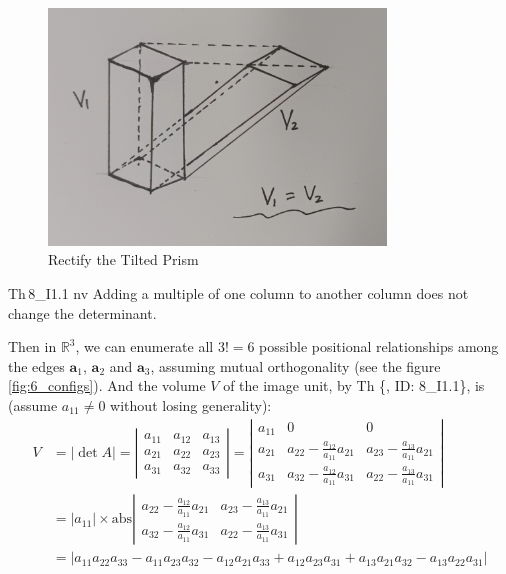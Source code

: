 \documentclass{article}
\begin{document}
\begin{figure}[H]
    \centering
    \includegraphics[width=0.8\textwidth]{figs_I1/2.jpg}
    \caption{Rectify the Tilted Prism}
    \label{fig:rectify_prism}
\end{figure}

\begin{Th}{Th\,8\_I1.1 nv}
    Adding a multiple of one column to another column does not change the determinant.
\end{Th}

Then in $\mathbb{R}^3$, we can enumerate all $3!=6$ possible positional relationships among the edges $\pmb{a}_1$, $\pmb{a}_2$ and $\pmb{a}_3$, assuming mutual orthogonality (see the figure \ref{fig:6_configs}). And the volume $V$ of the image unit, by Th \{, ID: 8\_I1.1\}, is (assume $a_{11}\neq 0$ without losing generality):
\begin{equation}
    \begin{aligned}
        V &= |\det A| = \left|\begin{array}{ccc}
        a_{11} & a_{12} & a_{13} \\
        a_{21} & a_{22} & a_{23} \\
        a_{31} & a_{32} & a_{33} 
    \end{array}\right| = \left|\begin{array}{ccc}
        a_{11} & 0 & 0 \\
        a_{21} & a_{22}-\frac{a_{12}}{a_{11}}a_{21} & a_{23}-\frac{a_{13}}{a_{11}}a_{21} \\
        a_{31} & a_{32}-\frac{a_{12}}{a_{11}}a_{31} & a_{22}-\frac{a_{13}}{a_{11}}a_{31} 
    \end{array}\right| \\
        &= |a_{11}|\times \text{abs} \left|\begin{array}{cc}
            a_{22}-\frac{a_{12}}{a_{11}}a_{21} & a_{23}-\frac{a_{13}}{a_{11}}a_{21} \\
            a_{32}-\frac{a_{12}}{a_{11}}a_{31} & a_{22}-\frac{a_{13}}{a_{11}}a_{31}
        \end{array}\right| \\
        &= | a_{11}a_{22}a_{33} - a_{11}a_{23}a_{32} - a_{12}a_{21}a_{33} + a_{12}a_{23}a_{31} + a_{13}a_{21}a_{32} - a_{13}a_{22}a_{31} |
    \end{aligned}
    \label{eq:abs_det_3}
\end{equation}
\end{document}
